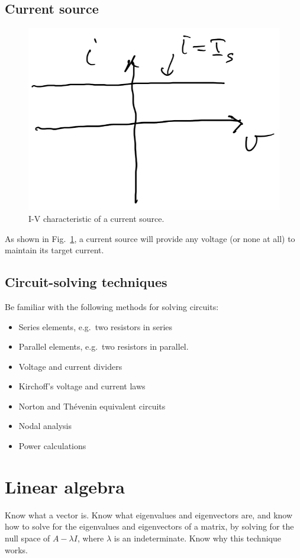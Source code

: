 \subsection{Current source}
\begin{figure}
  \centering
  \includegraphics[width=0.5\linewidth]{figures/IV-current-source}
  \caption{I-V characteristic of a current source.}
  \label{figure:circuit-review:IV-CS}
\end{figure}
As shown in Fig.~\ref{figure:circuit-review:IV-CS},
a current source will provide any voltage (or none at all) to
maintain its target current.

\subsection{Circuit-solving techniques}
Be familiar with the following methods for solving circuits:
\begin{itemize}
  \item Series elements, e.g.~two resistors in series
  \item Parallel elements, e.g.~two resistors in parallel.
  \item Voltage and current dividers
  \item Kirchoff's voltage and current laws
  \item Norton and Th\'evenin equivalent circuits
  \item Nodal analysis
  \item Power calculations
\end{itemize}

\section{Linear algebra}
Know what a vector is. Know what eigenvalues and eigenvectors are,
and know how to solve for the eigenvalues and eigenvectors of a matrix,
by solving for the null space of \(A - \lambda I\), where
\(\lambda\) is an indeterminate. Know why this technique works.
